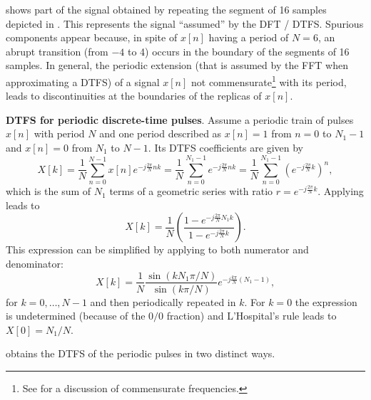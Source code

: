  shows part of the signal obtained by repeating the segment of 16 samples depicted in . This represents the signal ``assumed'' by the DFT / DTFS. Spurious components appear because, in spite of $x[n]$ having a period of $N=6$, an abrupt transition (from $-4$ to 4) occurs in the boundary of the segments of 16 samples. In general, the periodic extension (that is
assumed by the FFT when approximating a DTFS) of a signal $x[n]$ not commensurate\footnote{See  for a discussion of commensurate frequencies.} with its 
period, leads to discontinuities at the boundaries of the replicas of $x[n]$.
\eApplication

\bApplication \label{ex:periodic_pulse}\textbf{DTFS for periodic discrete-time pulses}. Assume a periodic train of pulses $x[n]$ with period $N$ and one period described as $x[n]=1$ from $n=0$ to $N_1-1$ and $x[n]=0$ from $N_1$ to $N-1$.
Its DTFS coefficients are given by
\[
X[k] = \frac{1}{N} \sum_{n=0}^{N-1} x[n] e^{-j \frac{2\pi}{N} n k}= \frac{1}{N} \sum_{n=0}^{N_1-1} e^{-j \frac{2\pi}{N} n k} = \frac{1}{N} \sum_{n=0}^{N_1-1} \left( e^{-j \frac{2\pi}{N} k } \right)^n,
\]
which is the sum of $N_1$ terms of a geometric series with ratio $r=e^{-j \frac{2\pi}{N} k}$. Applying  leads to
\[
X[k] = \frac{1}{N}  \left( \frac{1-e^{-j \frac{2\pi}{N} N_1 k}}{1 - e^{-j \frac{2\pi}{N} k}} \right).
\]
This expression can be simplified by applying  to both numerator and denominator:
\begin{equation}
X[k] =  \frac{1}{N}  \frac{\sin( k N_1 \pi / N)}{\sin(k \pi / N)} e^{-j \frac{k \pi}{N} (N_1-1)},
\label{eq:dtfs_pulses}
\end{equation}
for $k=0,\ldots,N-1$ and then periodically repeated in $k$. For $k=0$ the expression is undetermined (because of the $0/0$ fraction) and L'Hospital's rule leads to $X[0]=N_1 / N$.

 obtains the DTFS of the periodic pulses in two distinct ways.

